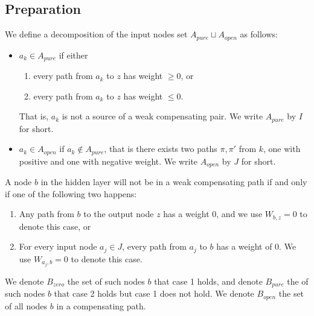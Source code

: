 				
				\subsection{Preparation}
				
				
				
				
				\begin{definition}
					We define a decomposition of the input nodes set $A_{pure}\sqcup A_{open}$ as follows:  
					\begin{itemize}
						\item $a_k \in A_{pure}$  if either
						\begin{enumerate}
							\item every path from $a_k$ to $z$ has weight $\geq 0$, or
							\item every path from $a_k$ to $z$ has weight $\leq 0$. 
						
						\end{enumerate}
						That is, $a_k$ is not a source of a weak compensating pair. 	We write $A_{pure}$ by $I$ for short.
						\item $a_k \in A_{open}$ if $a_k \notin A_{pure}$, that is there exists two paths $\pi,\pi'$ from $k$, 
						one with positive and one with negative weight. 	We write $A_{open}$ by $J$ for short.
					\end{itemize}
				\end{definition} 
				
				
				
				\begin{lemma} \label{lem:open_node_2}
					A node $b$ in the hidden layer will not be in a weak compensating path if and only if one of the following two happens:
					\begin{enumerate}
					  	\item Any path from $b$ to the output node $z$ has a weight $0$, and we use $W_{b,z}=0$ to denote this case, or
						\item For every input node $a_j\in J$, every path from $a_j$ to $b$ has a weight of $0$. We use $W_{a_j,b}=0$ to denote this case.
					\end{enumerate}
				
				\end{lemma}
				
					We denote $B_{zero}$ the set of such nodes $b$ that case 1 holds, and denote $B_{pure}$ the of such nodes $b$ that case 2 holds but case 1 does not hold.	We denote $B_{open}$ the set of all nodes $b$ in a compensating path.
				
